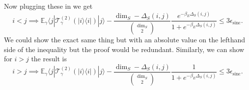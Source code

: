 \documentclass{article}
\newcommand{\ket}[1]{|#1\rangle}
\newcommand{\bra}[1]{\langle #1|}
\newcommand{\ketbra}[2]{| #1\rangle\! \langle #2|}
\DeclareMathOperator{\sinc}{sinc}
\begin{document}
Now plugging these in we get
\begin{equation}
    i < j \implies \mathbb{E}_{\gamma} \bra{j} \mathcal{T}^{(2)}_{\gamma}(\ketbra{i}{i})\ket{j} - \frac{\dim_S - \Delta_S(i,j)}{\binom{\dim_S}{2}} \frac{e^{-\beta_E \Delta_S(i,j)}}{1 + e^{-\beta_E \Delta_S(i,j)}} \le 3 \epsilon_{\sinc}.
\end{equation}
We could show the exact same thing but with an absolute value on the lefthand side of the inequality but the proof would be redundant. Similarly, we can show for $i > j$ the result is
\begin{equation}
    i > j \implies \mathbb{E}_{\gamma} \bra{j} \mathcal{T}^{(2)}_{\gamma}(\ketbra{i}{i})\ket{j} - \frac{\dim_S - \Delta_S(i,j)}{\binom{\dim_S}{2}} \frac{1}{1 + e^{-\beta_E \Delta_S(i,j)}} \le 3 \epsilon_{\sinc}.
\end{equation}
\end{document}
